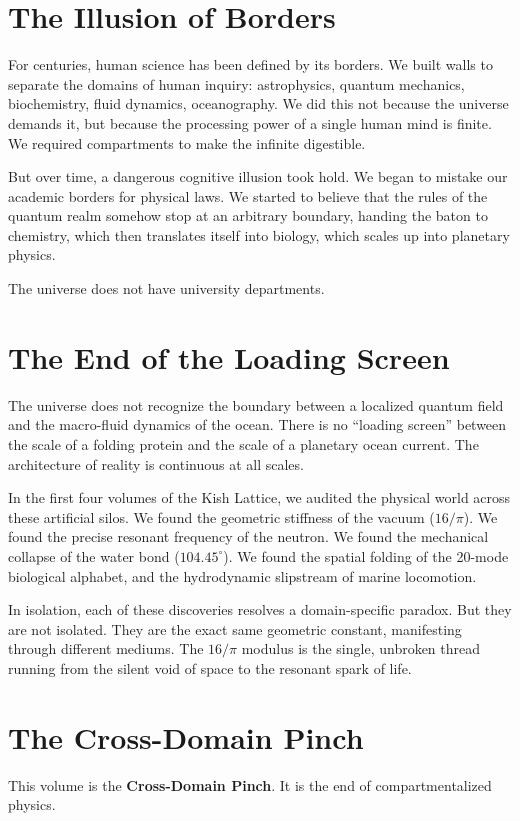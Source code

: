 \documentclass[11pt, letterpaper, openany]{book}
\begin{document}
\section*{The Illusion of Borders}
For centuries, human science has been defined by its borders. We built walls to separate the
domains of human inquiry: astrophysics, quantum mechanics, biochemistry, fluid dynamics,
oceanography. We did this not because the universe demands it, but because the processing power
of a single human mind is finite. We required compartments to make the infinite digestible.

But over time, a dangerous cognitive illusion took hold. We began to mistake our academic
borders for physical laws. We started to believe that the rules of the quantum realm somehow stop
at an arbitrary boundary, handing the baton to chemistry, which then translates itself into biology,
which scales up into planetary physics.

The universe does not have university departments.

\section*{The End of the Loading Screen}
The universe does not recognize the boundary between a localized quantum field and the
macro-fluid dynamics of the ocean. There is no ``loading screen'' between the scale of a folding
protein and the scale of a planetary ocean current. The architecture of reality is continuous at
all scales.

In the first four volumes of the Kish Lattice, we audited the physical world across these
artificial silos. We found the geometric stiffness of the vacuum ($16/\pi$). We found the precise
resonant frequency of the neutron. We found the mechanical collapse of the water bond
($104.45^\circ$). We found the spatial folding of the 20-mode biological alphabet, and the
hydrodynamic slipstream of marine locomotion.

In isolation, each of these discoveries resolves a domain-specific paradox. But they are not
isolated. They are the exact same geometric constant, manifesting through different mediums.
The $16/\pi$ modulus is the single, unbroken thread running from the silent void of space to the
resonant spark of life.

\section*{The Cross-Domain Pinch}
This volume is the \textbf{Cross-Domain Pinch}. It is the end of compartmentalized physics.
\end{document}
